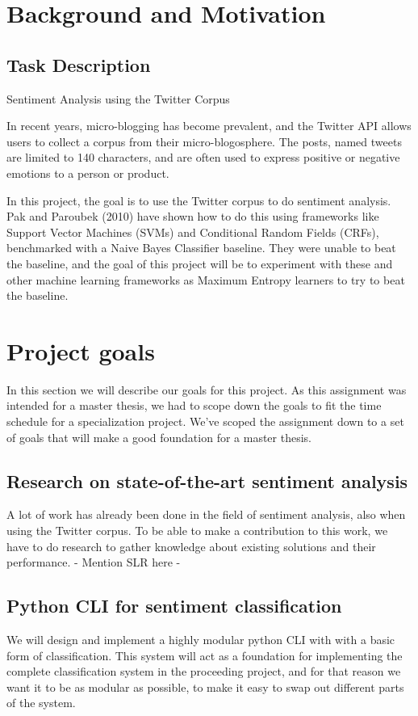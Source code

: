 \section{Background and Motivation}
	\subsection{Task Description}

\begin{center} \Large Sentiment Analysis using the Twitter Corpus \end{center}
\begin{normalsize}
In recent years, micro-blogging has become prevalent, and the Twitter API allows users to collect a corpus from their micro-blogosphere. The posts, named tweets are limited to 140 characters, and are often used to express positive or negative emotions to a person or product.

In this project, the goal is to use the Twitter corpus to do sentiment analysis. Pak and Paroubek (2010) have shown how to do this using frameworks like Support Vector Machines (SVMs) and Conditional Random Fields (CRFs), benchmarked with a Naive Bayes Classifier baseline. They were unable to beat the baseline, and the goal of this project will be to experiment with these and other machine learning frameworks as Maximum Entropy learners to try to beat the baseline.
\end{normalsize}

\section{Project goals}
In this section we will describe our goals for this project. As this assignment was intended for a master thesis, we had to scope down the goals to fit the time schedule for a specialization project. We've scoped the assignment down to a set of goals that will make a good foundation for a master thesis.
	\subsection{Research on state-of-the-art sentiment analysis}
	A lot of work has already been done in the field of sentiment analysis, also when using the Twitter corpus. To be able to make a contribution to this work, we have to do research to gather knowledge about existing solutions and their performance. - Mention SLR here -
	\subsection{Python CLI for sentiment classification}
	We will design and implement a highly modular python CLI with with a basic form of classification. This system will act as a foundation for implementing the complete classification system in the proceeding project, and for that reason we want it to be as modular as possible, to make it easy to swap out different parts of the system. 
